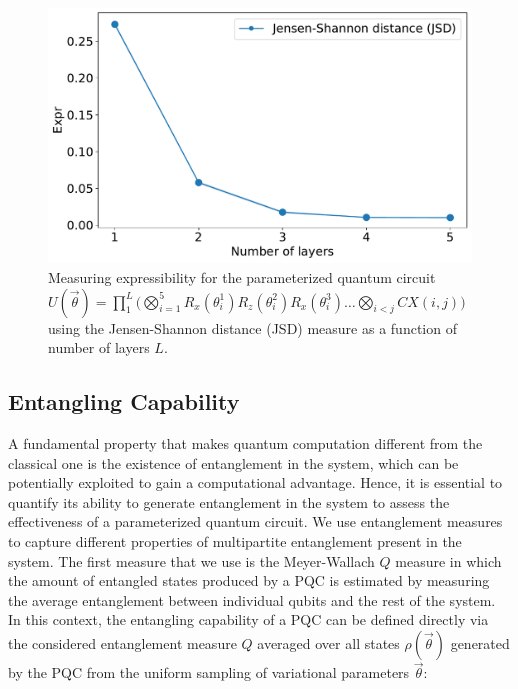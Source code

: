 \begin{figure}[ht]
    \centering
    \includegraphics[width=0.6\linewidth]{figures/qleet/expressibility-measure.pdf}
    \caption[Visualizing entanglement spectrum for parameterized quantum circuits]{Measuring expressibility for the parameterized quantum circuit $U(\vec{\theta}) =  \prod_{1}^{L}\big(\bigotimes_{i=1}^{5}R_x(\theta_i^1)R_z(\theta_i^2)R_x(\theta_i^3) \ldots \bigotimes_{i<j}CX(i, j)\big)$ using the Jensen-Shannon distance (JSD) measure as a function of number of layers $L$. }
    \label{fig:expressibility-measure}
\end{figure}

\subsection{Entangling Capability}

A fundamental property that makes quantum computation different from the classical one is the existence of entanglement in the system, which can be potentially exploited to gain a computational advantage. Hence, it is essential to quantify its ability to generate entanglement in the system to assess the effectiveness of a parameterized quantum circuit. We use entanglement measures to capture different properties of multipartite entanglement present in the system. The first measure that we use is the Meyer-Wallach $Q$ measure \cite{expressibility-entanglability-guzik,doi:10.1063/1.1497700} in which the amount of entangled states produced by a PQC is estimated by measuring the average entanglement between individual qubits and the rest of the system. In this context, the entangling capability of a PQC can be defined directly via the considered entanglement measure $Q$ averaged over all states $\rho(
\vec{\theta})$ generated by the PQC from the uniform sampling of variational parameters $\vec{\theta}$:

